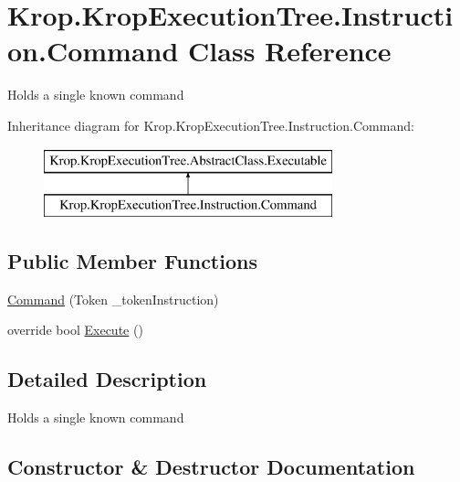 \hypertarget{class_krop_1_1_krop_execution_tree_1_1_instruction_1_1_command}{}\section{Krop.\+Krop\+Execution\+Tree.\+Instruction.\+Command Class Reference}
\label{class_krop_1_1_krop_execution_tree_1_1_instruction_1_1_command}


Holds a single known command  


Inheritance diagram for Krop.\+Krop\+Execution\+Tree.\+Instruction.\+Command\+:\begin{figure}[H]
\begin{center}
\leavevmode
\includegraphics[height=2.000000cm]{class_krop_1_1_krop_execution_tree_1_1_instruction_1_1_command}
\end{center}
\end{figure}
\subsection*{Public Member Functions}
\begin{DoxyCompactItemize}
\item 
\mbox{\hyperlink{class_krop_1_1_krop_execution_tree_1_1_instruction_1_1_command_a2b946e88b50cff120ddd2a3946c77b70}{Command}} (Token \+\_\+token\+Instruction)
\item 
override bool \mbox{\hyperlink{class_krop_1_1_krop_execution_tree_1_1_instruction_1_1_command_ab0fc1d51e07e167cea0262e55e0de8af}{Execute}} ()
\end{DoxyCompactItemize}


\subsection{Detailed Description}
Holds a single known command 



\subsection{Constructor \& Destructor Documentation}
\mbox{\label{class_krop_1_1_krop_execution_tree_1_1_instruction_1_1_command_a2b946e88b50cff120ddd2a3946c77b70}} 
